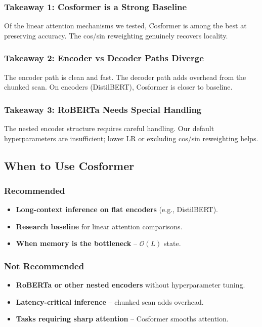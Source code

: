 \subsubsection{Takeaway 1: Cosformer is a Strong Baseline}

Of the linear attention mechanisms we tested, Cosformer is among the best 
at preserving accuracy. The cos/sin reweighting genuinely recovers locality.

\subsubsection{Takeaway 2: Encoder vs Decoder Paths Diverge}

The encoder path is clean and fast. The decoder path adds overhead from 
the chunked scan. On encoders (DistilBERT), Cosformer is closer to baseline.

\subsubsection{Takeaway 3: RoBERTa Needs Special Handling}

The nested encoder structure requires careful handling. Our default 
hyperparameters are insufficient; lower LR or excluding cos/sin reweighting 
helps.

\subsection{When to Use Cosformer}

\subsubsection{Recommended}

\begin{itemize}
\item \textbf{Long-context inference on flat encoders} (e.g., DistilBERT).
\item \textbf{Research baseline} for linear attention comparisons.
\item \textbf{When memory is the bottleneck} -- $\mathcal{O}(L)$ state.

\end{itemize}
\subsubsection{Not Recommended}

\begin{itemize}
\item \textbf{RoBERTa or other nested encoders} without hyperparameter tuning.
\item \textbf{Latency-critical inference} -- chunked scan adds overhead.
\item \textbf{Tasks requiring sharp attention} -- Cosformer smooths attention.

\end{itemize}
